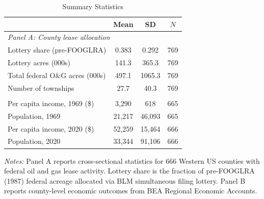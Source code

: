 \begin{table}[htbp]
\centering
\caption{Summary Statistics}
\label{tab:sumstats}
\begin{tabular}{lccc}
\hline\hline
 & Mean & SD & $N$ \\
\hline
\multicolumn{4}{l}{\textit{Panel A: County lease allocation}} \\
Lottery share (pre-FOOGLRA) & 0.383 & 0.292 & 769 \\
Lottery acres (000s) & 141.3 & 365.3 & 769 \\
Total federal O\&G acres (000s) & 497.1 & 1065.3 & 769 \\
Number of townships & 27.7 & 40.3 & 769 \\
\addlinespace
\multicolumn{4}{l}{\textit{Panel B: County economic outcomes}} \\
Per capita income, 1969 (\$) & 3,290 & 618 & 665 \\
Population, 1969 & 21,217 & 46,093 & 665 \\
Per capita income, 2020 (\$) & 52,259 & 15,464 & 666 \\
Population, 2020 & 33,344 & 91,106 & 666 \\
\hline\hline
\end{tabular}
\vspace{0.5em}\begin{flushleft}\small
\textit{Notes:} Panel A reports cross-sectional statistics for 666 Western US counties with federal oil and gas lease activity. Lottery share is the fraction of pre-FOOGLRA (1987) federal acreage allocated via BLM simultaneous filing lottery. Panel B reports county-level economic outcomes from BEA Regional Economic Accounts.
\end{flushleft}
\end{table}

